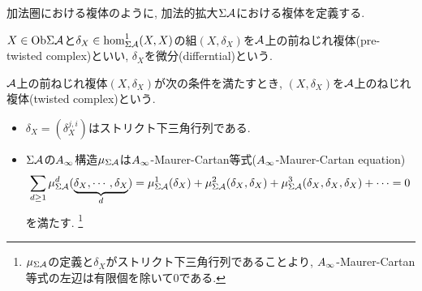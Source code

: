 \documentclass[aspectratio=169, dvipdfmx, 8pt, notheorems, uplatex]{beamer}
\begin{document}
\begin{frame}{}
  加法圏における複体のように, 加法的拡大$\Sigma\mathcal{A}$における複体を定義する. 
  
  \begin{definition}[前ねじれ複体]
    $X \in \mathrm{Ob}\Sigma\mathcal{A}$と$\delta_X \in \hom^1_{\Sigma\mathcal{A}}(X,X)$の組$(X,\delta_X)$を$\mathcal{A}$上の前ねじれ複体(pre-twisted complex)といい, $\delta_X$を微分(differntial)という. 
  \end{definition} 

  \begin{definition}[ねじれ複体]
    $\mathcal{A}$上の前ねじれ複体$(X,\delta_X)$が次の条件を満たすとき, $(X,\delta_X)$を$\mathcal{A}$上のねじれ複体(twisted complex)という. 
    \begin{itemize}
      \item $\delta_X = (\delta_X^{j,i})$はストリクト下三角行列である. 
      \item $\Sigma\mathcal{A}$の$A_\infty$構造$\mu_{\Sigma\mathcal{A}}$は$A_\infty$-Maurer-Cartan等式($A_\infty$-Maurer-Cartan equation)
      \begin{align*}
        \sum_{d \geq 1} \mu^d_{\Sigma\mathcal{A}} (\underbrace{\delta_X,\cdots,\delta_X}_{d})
        = \mu^1_{\Sigma\mathcal{A}}(\delta_X) + \mu^2_{\Sigma\mathcal{A}}(\delta_X,\delta_X) + \mu^3_{\Sigma\mathcal{A}}(\delta_X,\delta_X,\delta_X) + \cdots = 0
      \end{align*}
      を満たす. 
      \footnote{
        $\mu_{\Sigma\mathcal{A}}$の定義と$\delta_X$がストリクト下三角行列であることより, $A_\infty$-Maurer-Cartan等式の左辺は有限個を除いて$0$である.
      }
    \end{itemize}
  \end{definition}
\end{frame}
\end{document}
